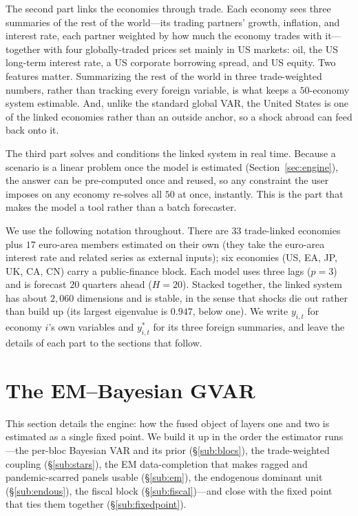 \documentclass[11pt]{article}
\begin{document}
The second part links the economies through trade. Each economy sees three summaries of the rest of the
world---its trading partners' growth, inflation, and interest rate, each partner weighted by how much the
economy trades with it---together with four globally-traded prices set mainly in US markets: oil, the US
long-term interest rate, a US corporate borrowing spread, and US equity. Two features matter. Summarizing
the rest of the world in three trade-weighted numbers, rather than tracking every foreign variable, is
what keeps a $50$-economy system estimable. And, unlike the standard global VAR, the United States is one
of the linked economies rather than an outside anchor, so a shock abroad can feed back onto it.

The third part solves and conditions the linked system in real time. Because a scenario is a linear
problem once the model is estimated (Section~\ref{sec:engine}), the answer can be pre-computed once and
reused, so any constraint the user imposes on any economy re-solves all $50$ at once, instantly. This is
the part that makes the model a tool rather than a batch forecaster.

We use the following notation throughout. There are $33$ trade-linked economies plus $17$ euro-area
members estimated on their own (they take the euro-area interest rate and related series as external
inputs); six economies (US, EA, JP, UK, CA, CN) carry a public-finance block. Each model uses three lags
($p=3$) and is forecast $20$ quarters ahead ($H=20$). Stacked together, the linked system has about
$2{,}060$ dimensions and is stable, in the sense that shocks die out rather than build up (its largest
eigenvalue is $0.947$, below one). We write $y_{i,t}$ for economy $i$'s own variables and $y^{*}_{i,t}$
for its three foreign summaries, and leave the details of each part to the sections that follow.

\section{The EM--Bayesian GVAR}
\label{sec:estimation}

This section details the engine: how the fused object of layers one and two is estimated as a single
fixed point. We build it up in the order the estimator runs---the per-bloc Bayesian VAR and its prior
(\S\ref{sub:blocs}), the trade-weighted coupling (\S\ref{sub:stars}), the EM data-completion that makes
ragged and pandemic-scarred panels usable (\S\ref{sub:em}), the endogenous dominant unit
(\S\ref{sub:endous}), the fiscal block (\S\ref{sub:fiscal})---and close with the fixed point that ties
them together (\S\ref{sub:fixedpoint}).
\end{document}
